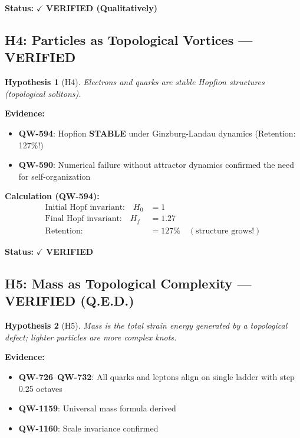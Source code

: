 \documentclass[11pt, a4paper]{article}
\newtheorem{hypothesis}{Hypothesis}[section]
\theoremstyle{remark}
\newcommand{\QW}[1]{\textbf{QW-#1}}
\begin{document}
\textbf{Status:} $\checkmark$ \textbf{VERIFIED (Qualitatively)}

\subsection{H4: Particles as Topological Vortices --- VERIFIED}

\begin{hypothesis}[H4]
Electrons and quarks are stable Hopfion structures (topological solitons).
\end{hypothesis}

\textbf{Evidence:}
\begin{itemize}
    \item \QW{594}: Hopfion \textbf{STABLE} under Ginzburg-Landau dynamics (Retention: 127\%!)
    \item \QW{590}: Numerical failure without attractor dynamics confirmed the need for self-organization
\end{itemize}

\textbf{Calculation (\QW{594}):}
\begin{align}
\text{Initial Hopf invariant:} \quad H_0 &= 1 \\
\text{Final Hopf invariant:} \quad H_f &= 1.27 \\
\text{Retention:} \quad &= 127\% \quad (\text{structure grows!})
\end{align}

\textbf{Status:} $\checkmark$ \textbf{VERIFIED}

\subsection{H5: Mass as Topological Complexity --- VERIFIED (Q.E.D.)}

\begin{hypothesis}[H5]
Mass is the total strain energy generated by a topological defect; lighter particles are more complex knots.
\end{hypothesis}

\textbf{Evidence:}
\begin{itemize}
    \item \QW{726}--\QW{732}: All quarks and leptons align on single ladder with step 0.25 octaves
    \item \QW{1159}: Universal mass formula derived
    \item \QW{1160}: Scale invariance confirmed
\end{itemize}
\end{document}
